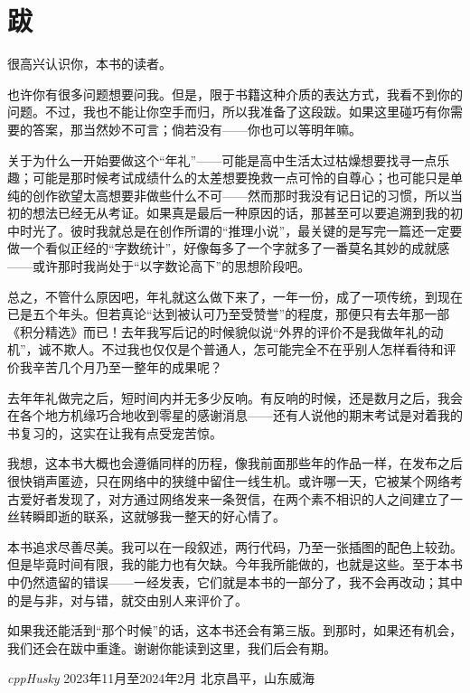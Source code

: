 \chapter*{跋}
很高兴认识你，本书的读者。\par
也许你有很多问题想要问我。但是，限于书籍这种介质的表达方式，我看不到你的问题。不过，我也不能让你空手而归，所以我准备了这段跋。如果这里碰巧有你需要的答案，那当然妙不可言；倘若没有——你也可以等明年嘛。\par
关于为什么一开始要做这个``年礼''——可能是高中生活太过枯燥想要找寻一点乐趣；可能是那时候考试成绩什么的太差想要挽救一点可怜的自尊心；也可能只是单纯的创作欲望太高想要非做些什么不可——然而那时我没有记日记的习惯，所以当初的想法已经无从考证。如果真是最后一种原因的话，那甚至可以要追溯到我的初中时光了。彼时我就总是在创作所谓的``推理小说''，最关键的是写完一篇还一定要做一个看似正经的``字数统计''，好像每多了一个字就多了一番莫名其妙的成就感——或许那时我尚处于``以字数论高下''的思想阶段吧。\par
总之，不管什么原因吧，年礼就这么做下来了，一年一份，成了一项传统，到现在已是五个年头。但若真论``达到被认可乃至受赞誉''的程度，那便只有去年那一部《积分精选》而已！去年我写后记的时候貌似说``外界的评价不是我做年礼的动机''，诚不欺人。不过我也仅仅是个普通人，怎可能完全不在乎别人怎样看待和评价我辛苦几个月乃至一整年的成果呢？\par
去年年礼做完之后，短时间内并无多少反响。有反响的时候，还是数月之后，我会在各个地方机缘巧合地收到零星的感谢消息——还有人说他的期末考试是对着我的书复习的，这实在让我有点受宠苦惊。\par
我想，这本书大概也会遵循同样的历程，像我前面那些年的作品一样，在发布之后很快销声匿迹，只在网络中的狭缝中留住一线生机。或许哪一天，它被某个网络考古爱好者发现了，对方通过网络发来一条贺信，在两个素不相识的人之间建立了一丝转瞬即逝的联系，这就够我一整天的好心情了。\par
本书追求尽善尽美。我可以在一段叙述，两行代码，乃至一张插图的配色上较劲。但是毕竟时间有限，我的能力也有欠缺。今年我所能做的，也就是这些。至于本书中仍然遗留的错误——一经发表，它们就是本书的一部分了，我不会再改动；其中的是与非，对与错，就交由别人来评价了。\par
如果我还能活到``那个时候''的话，这本书还会有第三版。到那时，如果还有机会，我们还会在跋中重逢。谢谢你能读到这里，我们后会有期。\par
\begin{flushright}
\textit{cppHusky}
2023年11月至2024年2月
北京昌平，山东威海
\end{flushright}
